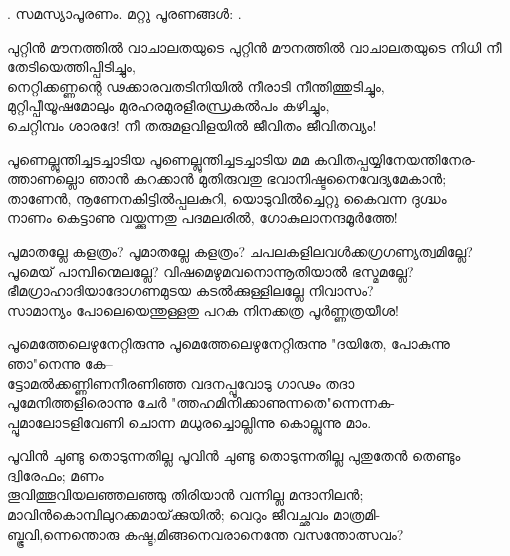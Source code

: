 \begin{enumerate}

.
സമസ്യാപൂരണം. മറ്റു പൂരണങ്ങൾ: .


\begin{slokam}{\VSr}{\YK}{പുറ്റിൻ മൗനത്തിൽ വാചാലതയുടെ}
പുറ്റിൻ മൗനത്തിൽ വാചാലതയുടെ നിധി നീ തേടിയെത്തിപ്പിടിച്ചും,\\
നെറ്റിക്കണ്ണന്റെ ഢക്കാരവതടിനിയിൽ നീരാടി നീന്തിത്തുടിച്ചും,\\
മുറ്റിപ്പീയൂഷമോലും മുരഹരമുരളീരന്ധ്രകൽപം കഴിച്ചും,\\
ചെറ്റിമ്പം ശാരദേ! നീ തരുമളവിളയിൽ ജീവിതം ജീവിതവ്യം!
\end{slokam}



\begin{slokam}{\VSr}{\VKG}{പൂണെല്ലുന്തിച്ചടച്ചാടിയ}
പൂണെല്ലുന്തിച്ചടച്ചാടിയ മമ കവിതപ്പയ്യിനേയന്തിനേര-\\
ത്താണല്ലൊ ഞാൻ കറക്കാൻ മുതിരുവതു ഭവാനിഷ്ടനൈവേദ്യമേകാൻ;\\
താണേൻ, നൂണേനകിട്ടിൽപ്പലകുറി, യൊടുവിൽച്ചെറ്റു കൈവന്ന ദുഗ്ദ്ധം\\
നാണം കെട്ടാണു വയ്ക്കുന്നതു പദമലരിൽ, ഗോകുലാനന്ദമൂർത്തേ!
\end{slokam}



\begin{slokam}{\VSr}{\ONN}{പൂമാതല്ലേ കളത്രം?}
പൂമാതല്ലേ കളത്രം? ചപലകളിലവള്‍ക്കഗ്രഗണ്യത്വമില്ലേ?\\
പൂമെയ്‌ പാമ്പിന്മെലല്ലേ? വിഷമെഴുമവനൊന്നൂതിയാൽ ഭസ്മമല്ലേ?\\
ഭീമഗ്രാഹാദിയാദോഗണമുടയ കടൽക്കുള്ളിലല്ലേ നിവാസം?\\
സാമാന്യം പോലെയെന്തുള്ളതു പറക നിനക്കത്ര പൂർണ്ണത്രയീശ!
\end{slokam}


\begin{slokam}{\VSv}{\Poonth}{പൂമെത്തേലെഴുനേറ്റിരുന്നു}
പൂമെത്തേലെഴുനേറ്റിരുന്നു "ദയിതേ, പോകുന്നു ഞാ"നെന്നു കേ--\\
ട്ടോമൽക്കണ്ണിണനീരണിഞ്ഞ വദനപ്പൂവോടു ഗാഢം തദാ\\
പൂമേനിത്തളിരൊന്നു ചേർ "ത്തഹമിനിക്കാണുന്നതെ"ന്നെന്നക-\\
പ്പൂമാലോടളിവേണി ചൊന്ന മധുരച്ചൊല്ലിന്നു കൊല്ലുന്നു മാം.
\end{slokam}


\begin{slokam}{\VSv}{\KND}{പൂവിൻ ചുണ്ടു തൊടുന്നതില്ല}
പൂവിൻ ചുണ്ടു തൊടുന്നതില്ല പുതുതേൻ തെണ്ടും ദ്വിരേഫം; മണം\\
തൂവിത്തൂവിയലഞ്ഞലഞ്ഞു തിരിയാൻ വന്നില്ല മന്ദാനിലൻ;\\
മാവിൻകൊമ്പിലുറക്കമായ്‌ക്കുയിൽ; വെറും ജീവച്ഛവം മാത്രമി-\\
ബ്ഭൂവി,ന്നെന്തൊരു കഷ്ട,മിങ്ങനെവരാനെന്തേ വസന്തോത്സവം?
\end{slokam}


\end{enumerate}
